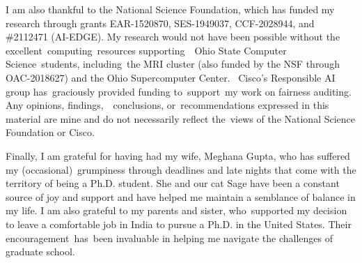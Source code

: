 I am also thankful to the National Science Foundation, which has funded my research through grants  EAR-1520870, SES-1949037, CCF-2028944, and \#2112471 (AI-EDGE).
My research would not have been possible without the excellent computing resources supporting  Ohio State Computer Science students, including the MRI cluster (also funded by the NSF through OAC-2018627) and the Ohio Supercomputer Center. 
Cisco's Responsible AI group has graciously provided funding to support my work on fairness auditing.
Any opinions, findings,  conclusions, or recommendations expressed in this material are mine and do not necessarily reflect the views of the National Science Foundation or Cisco.

Finally, I am grateful for having had my wife, Meghana Gupta, who has suffered my (occasional) grumpiness through deadlines and late nights that come with the territory of being a Ph.D. student.
She and our cat Sage have been a constant source of joy and support and have helped me maintain a semblance of balance in my life.
I am also grateful to my parents and sister, who supported my decision to leave a comfortable job in India to pursue a Ph.D. in the United States.
Their encouragement has been invaluable in helping me navigate the challenges of graduate school.
